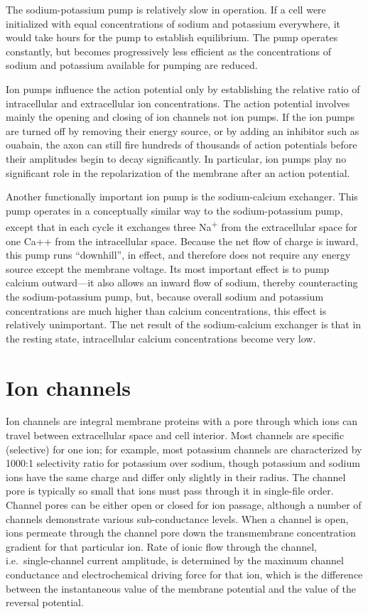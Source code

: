 The sodium-potassium pump is relatively slow in operation. If a cell were initialized with equal concentrations of sodium and potassium everywhere, it would take hours for the pump to establish equilibrium. The pump operates constantly, but becomes progressively less efficient as the concentrations of sodium and potassium available for pumping are reduced.

Ion pumps influence the action potential only by establishing the relative ratio of intracellular and extracellular ion concentrations. The action potential involves mainly the opening and closing of ion channels not ion pumps. If the ion pumps are turned off by removing their energy source, or by adding an inhibitor such as ouabain, the axon can still fire hundreds of thousands of action potentials before their amplitudes begin to decay significantly. In particular, ion pumps play no significant role in the repolarization of the membrane after an action potential.

Another functionally important ion pump is the sodium-calcium exchanger. This pump operates in a conceptually similar way to the sodium-potassium pump, except that in each cycle it exchanges three Na\textsuperscript{+} from the extracellular space for one Ca++ from the intracellular space. Because the net flow of charge is inward, this pump runs ``downhill'', in effect, and therefore does not require any energy source except the membrane voltage. Its most important effect is to pump calcium outward---it also allows an inward flow of sodium, thereby counteracting the sodium-potassium pump, but, because overall sodium and potassium concentrations are much higher than calcium concentrations, this effect is relatively unimportant. The net result of the sodium-calcium exchanger is that in the resting state, intracellular calcium concentrations become very low.

\hypertarget{ion-channels}{%
\section{Ion channels}\label{ion-channels}}

Ion channels are integral membrane proteins with a pore through which ions can travel between extracellular space and cell interior. Most channels are specific (selective) for one ion; for example, most potassium channels are characterized by 1000:1 selectivity ratio for potassium over sodium, though potassium and sodium ions have the same charge and differ only slightly in their radius. The channel pore is typically so small that ions must pass through it in single-file order. Channel pores can be either open or closed for ion passage, although a number of channels demonstrate various sub-conductance levels. When a channel is open, ions permeate through the channel pore down the transmembrane concentration gradient for that particular ion. Rate of ionic flow through the channel, i.e.~single-channel current amplitude, is determined by the maximum channel conductance and electrochemical driving force for that ion, which is the difference between the instantaneous value of the membrane potential and the value of the reversal potential.

